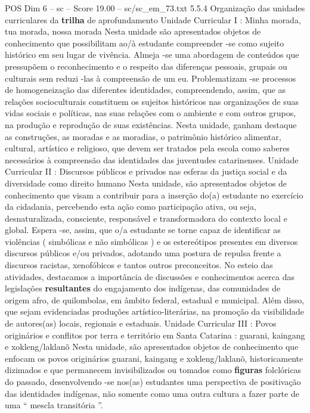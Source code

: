 \begin{textsample}{POS Dim 6 – sc – Score 19.00 – sc/sc\_em\_73.txt}  \label{ex:f6_pos_020}
5.5.4 Organização das unidades curriculares da \textbf{trilha} de aprofundamento Unidade Curricular I : Minha morada, tua morada, nossa morada Nesta unidade são apresentados objetos de conhecimento que possibilitam ao/à estudante compreender -se como sujeito histórico em seu lugar de vivência.
Almeja -se uma abordagem de conteúdos que pressupõem o reconhecimento e o respeito das diferenças pessoais, grupais ou culturais sem reduzi -las à compreensão de um eu.
Problematizam -se processos de homogeneização das diferentes identidades, compreendendo, assim, que as relações socioculturais constituem os sujeitos históricos nas organizações de suas vidas sociais e políticas, nas suas relações com o ambiente e com outros grupos, na produção e reprodução de suas existências.
Nesta unidade, ganham destaque as construções, as moradas e as moradias, o patrimônio histórico alimentar, cultural, artístico e religioso, que devem ser tratados pela escola como saberes necessários à compreensão das identidades das juventudes catarinenses.
Unidade Curricular II : Discursos públicos e privados nas esferas da justiça social e da diversidade como direito humano Nesta unidade, são apresentados objetos de conhecimento que visam a contribuir para a inserção do(a) estudante no exercício da cidadania, percebendo esta ação como participação ativa, ou seja, desnaturalizada, consciente, responsável e transformadora do contexto local e global.
Espera -se, assim, que o/a estudante se torne capaz de identificar as violências ( simbólicas e não simbólicas ) e os estereótipos presentes em diversos discursos públicos e/ou privados, adotando uma postura de repulsa frente a discursos racistas, xenofóbicos e tantos outros preconceitos.
No esteio das atividades, destacamos a importância de discussões e conhecimentos acerca das legislações \textbf{resultantes} do engajamento dos indígenas, das comunidades de origem afro, de quilombolas, em âmbito federal, estadual e municipal.
Além disso, que sejam evidenciadas produções artístico-literárias, na promoção da visibilidade de autores(as) locais, regionais e estaduais.
Unidade Curricular III : Povos originários e conflitos por terra e território em Santa Catarina : guarani, kaingang e xokleng/laklanõ Nesta unidade, são apresentados objetos de conhecimento que enfocam os povos originários guarani, kaingang e xokleng/laklanõ, historicamente dizimados e que permanecem invisibilizados ou tomados como \textbf{figuras} folclóricas do passado, desenvolvendo -se nos(as) estudantes uma perspectiva de positivação das identidades indígenas, não somente como uma outra cultura a fazer parte de uma “ mescla transitória ”.

\end{textsample}
